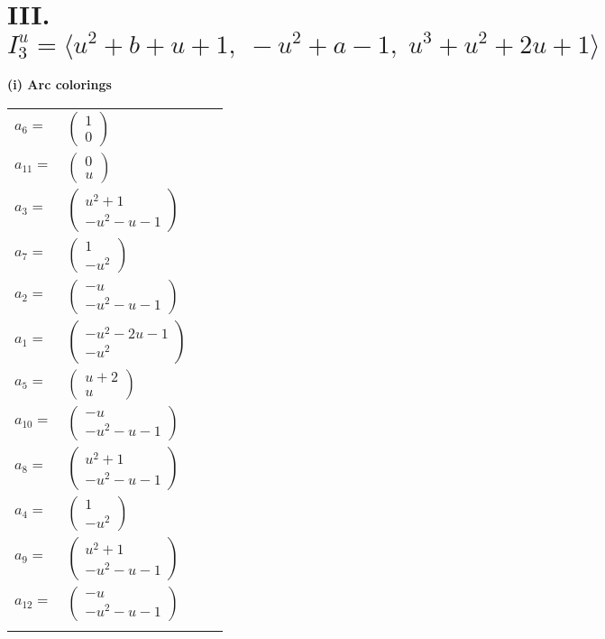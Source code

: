 \documentclass[1p]{elsarticle_modified}
\theoremstyle{definition}
\begin{document}
\centering \section*{III. $I^u_{3}= \langle u^2+b+u+1,\;- u^2+a-1,\;u^3+u^2+2 u+1 \rangle$}
\flushleft \textbf{(i) Arc colorings}\\
\begin{tabular}{m{7pt} m{180pt} m{7pt} m{180pt} }
\flushright $a_{6}=$&$\begin{pmatrix}1\\0\end{pmatrix}$ \\
\flushright $a_{11}=$&$\begin{pmatrix}0\\u\end{pmatrix}$ \\
\flushright $a_{3}=$&$\begin{pmatrix}u^2+1\\- u^2- u-1\end{pmatrix}$ \\
\flushright $a_{7}=$&$\begin{pmatrix}1\\- u^2\end{pmatrix}$ \\
\flushright $a_{2}=$&$\begin{pmatrix}- u\\- u^2- u-1\end{pmatrix}$ \\
\flushright $a_{1}=$&$\begin{pmatrix}- u^2-2 u-1\\- u^2\end{pmatrix}$ \\
\flushright $a_{5}=$&$\begin{pmatrix}u+2\\u\end{pmatrix}$ \\
\flushright $a_{10}=$&$\begin{pmatrix}- u\\- u^2- u-1\end{pmatrix}$ \\
\flushright $a_{8}=$&$\begin{pmatrix}u^2+1\\- u^2- u-1\end{pmatrix}$ \\
\flushright $a_{4}=$&$\begin{pmatrix}1\\- u^2\end{pmatrix}$ \\
\flushright $a_{9}=$&$\begin{pmatrix}u^2+1\\- u^2- u-1\end{pmatrix}$ \\
\flushright $a_{12}=$&$\begin{pmatrix}- u\\- u^2- u-1\end{pmatrix}$\\&\end{tabular}
\end{document}

